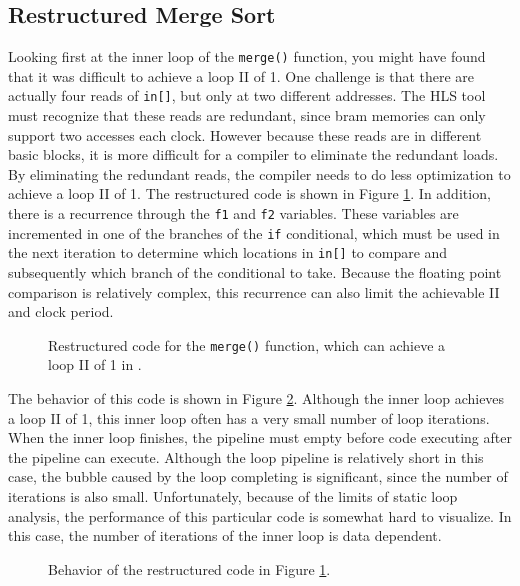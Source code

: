 \subsection{Restructured Merge Sort}
Looking first at the inner loop of the \lstinline{merge()} function, you might have found that it was difficult to achieve a loop II of 1.  One challenge is that there are actually four reads of \lstinline{in[]}, but only at two different addresses.   The HLS tool must recognize that these reads are redundant, since \gls{bram} memories can only support two accesses each clock.  However because these reads are in different basic blocks, it is more difficult for a compiler to eliminate the redundant loads.  By eliminating the redundant reads, the compiler needs to do less optimization to achieve a loop II of 1.  The restructured code is shown in Figure \ref{fig:merge_sort_restructured.cpp}.  In addition, there is a recurrence through the \lstinline{f1} and \lstinline{f2} variables.  These variables are incremented in one of the branches of the \lstinline{if} conditional, which must be used in the next iteration to determine which locations in \lstinline{in[]} to compare and subsequently which branch of the conditional to take.  Because the floating point comparison is relatively complex, this recurrence can also limit the achievable II and clock period.

\begin{figure}
{\tiny }
\caption{Restructured code for the \lstinline{merge()} function, which can achieve a loop II of 1 in \VHLS.}
\label{fig:merge_sort_restructured.cpp}
\end{figure}

The behavior of this code is shown in Figure \ref{fig:merge_sort_restructured_behavior}.  Although the inner loop achieves a loop II of 1, this inner loop often has a very small number of loop iterations.  When the inner loop finishes, the pipeline must empty before code executing after the pipeline can execute.  Although the loop pipeline is relatively short in this case, the bubble caused by the loop completing is significant, since the number of iterations is also small.  Unfortunately, because of the limits of static loop analysis, the performance of this particular code is somewhat hard to visualize.  In this case, the number of iterations of the inner loop is data dependent.

\begin{figure}
\centering
{\tiny }
\caption{Behavior of the restructured code in Figure \ref{fig:merge_sort_restructured.cpp}.}
\label{fig:merge_sort_restructured_behavior}
\end{figure}

